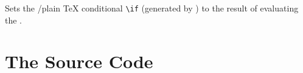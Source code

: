 \documentclass[oneside]{book}
\let\tn=\cs
\begin{document}
\begin{function}{\LegacyIfSet}
\begin{syntax}
  
\end{syntax}
Sets the \LaTeXe{}/plain \TeX{} conditional \verb|\if|
(generated by \tn{newif}) to the result of evaluating the
.
\begin{demohigh}
\newif \ifFooBar
{} {\cFalseBool}
 {} {}
\end{demohigh}
\end{function}

\chapter{The Source Code}

\end{document}
